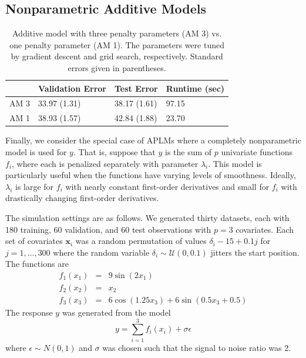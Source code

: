 \documentclass{statsoc}
\begin{document}
\subsection{Nonparametric Additive Models}

\begin{table}
\caption {\label{tab:additive} Additive model with three penalty parameters (AM 3) vs. one penalty parameter (AM 1). The parameters were tuned by gradient descent and grid search, respectively. Standard errors given in parentheses.}
\centering
\begin{tabular}{| l | l | l | l | }
\hline
& Validation Error & Test Error & Runtime (sec) \\
\hline
AM 3 & 33.97 (1.31) & 38.17 (1.61) & 97.15 \\
\hline
AM 1 & 38.93 (1.57) & 42.84 (1.88) & 23.70 \\
\hline
\end{tabular}
\end{table}

Finally, we consider the special case of APLMs where a completely nonparametric model is used for $y$. That is, suppose that $y$ is the sum of $p$ univariate functions $f_i$, where each is penalized separately with parameter $\lambda_i$. This model is particularly useful when the functions have varying levels of smoothness. Ideally, $\lambda_i$ is large for $f_i$ with nearly constant first-order derivatives and small for $f_i$ with drastically changing first-order derivatives. 

The simulation settings are as follows. We generated thirty datasets, each with 180 training, 60 validation, and 60 test observations with $p=3$ covariates. Each set of covariates $\boldsymbol{x}_i$ was a random permutation of values $\delta_i - 15 + 0.1 j$ for $j=1,...,300$ where the random variable $\delta_i \sim \mathcal{U}(0, 0.1)$ jitters the start position. The functions are 
\begin{equation}
\begin{array}{ccl}
f_1(x_1) &=& 9 \sin(2x_1)\\
f_2(x_2) &=& x_2 \\
f_3(x_3) &=& 6 \cos(1.25 x_3) + 6 \sin(0.5 x_3 + 0.5)
\end{array}
\end{equation}
The response $y$ was generated from the model 
\begin{equation}
y=\sum _{i=1}^3 f_i(x_i) + \sigma \epsilon
\end{equation}
where $\epsilon \sim N(0, 1)$ and $\sigma$ was chosen such that the signal to noise ratio was 2.
\end{document}
